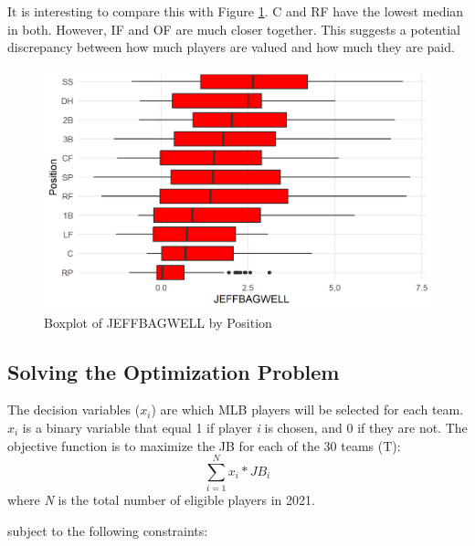 \documentclass{article}
\begin{document}
It is interesting to compare this with Figure \ref{fig:war_position_boxplot}. C and RF have the lowest median in both. However, IF and OF are much closer together. This suggests a potential discrepancy between how much players are valued and how much they are paid. 

\begin{figure}[H]
\caption{Boxplot of JEFFBAGWELL by Position}
\label{fig:war_position_boxplot}
\centering
\includegraphics[width=0.7\paperwidth, scale=1.25]{war_position_boxplots.png}
\end{figure}

\subsection{Solving the Optimization Problem}

The decision variables ($x_{i}$) are which MLB players will be selected for each team. $x_{i}$ is a binary variable that equal 1 if player \emph{i} is chosen, and 0 if they are not. The objective function is to maximize the JB for each of the 30 teams (T):
\begin{equation}
\sum_{i = 1}^{N} x_{i} * JB_{i}
\end{equation} where \emph{N} is the total number of eligible players in 2021.

subject to the following constraints:
\end{document}
